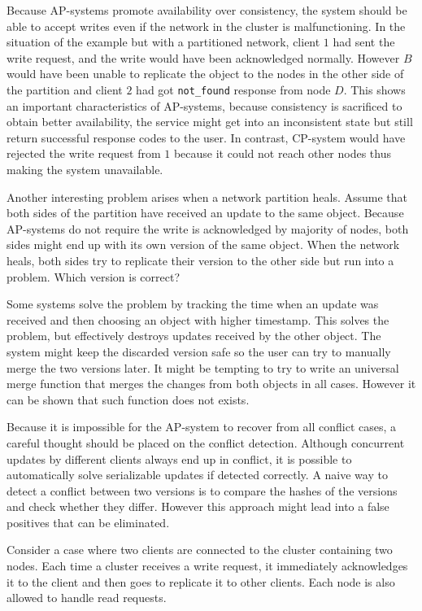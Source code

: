 Because AP-systems promote availability over consistency, the system should be
able to accept writes even if the network in the cluster is malfunctioning. In
the situation of the example but with a partitioned network, client \(1\) had
sent the write request, and the write would have been acknowledged normally.
However \(B\) would have been unable to replicate the object to the nodes in the
other side of the partition and client \(2\) had got \texttt{not\_found}
response from node \(D\). This shows an important characteristics of AP-systems,
because consistency is sacrificed to obtain better availability, the service
might get into an inconsistent state but still return successful response codes
to the user. In contrast, CP-system would have rejected the write request from
\(1\) because it could not reach other nodes thus making the system unavailable.

Another interesting problem arises when a network partition heals. Assume that
both sides of the partition have received an update to the same object. Because
AP-systems do not require the write is acknowledged by majority of nodes, both
sides might end up with its own version of the same object. When the network
heals, both sides try to replicate their version to the other side but run into
a problem. Which version is correct?

Some systems solve the problem by tracking the time when an update was received
and then choosing an object with higher timestamp. This solves the problem, but
effectively destroys updates received by the other object. The system might keep
the discarded version safe so the user can try to manually merge the two
versions later. It might be tempting to try to write an universal merge function
that merges the changes from both objects in all cases. However it can be shown
that such function does not exists.

Because it is impossible for the AP-system to recover from all conflict cases, a
careful thought should be placed on the conflict detection. Although concurrent
updates by different clients always end up in conflict, it is possible to
automatically solve serializable updates if detected correctly. A naive way to
detect a conflict between two versions is to compare the hashes of the versions
and check whether they differ. However this approach might lead into a false
positives that can be eliminated.

Consider a case where two clients are connected to the cluster containing two
nodes. Each time a cluster receives a write request, it immediately acknowledges
it to the client and then goes to replicate it to other clients. Each node is
also allowed to handle read requests.

